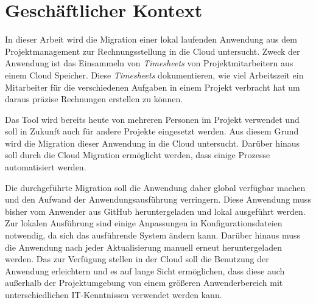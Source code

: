 \section{Geschäftlicher Kontext}

In dieser Arbeit wird die Migration einer lokal laufenden Anwendung aus dem Projektmanagement zur Rechnungsstellung in die Cloud untersucht. Zweck der Anwendung ist das Einsammeln von \textit{\glspl{Timesheet}} von Projektmitarbeitern aus einem Cloud Speicher. Diese \textit{\glspl{Timesheet}} dokumentieren, wie viel Arbeitszeit ein Mitarbeiter für die verschiedenen Aufgaben in einem Projekt verbracht hat um daraus präzise Rechnungen erstellen zu können.

Das Tool wird bereits heute von mehreren Personen im Projekt verwendet und soll in Zukunft auch für andere Projekte eingesetzt werden. Aus diesem Grund wird die Migration dieser Anwendung in die Cloud untersucht.
Darüber hinaus soll durch die Cloud Migration ermöglicht werden, dass einige Prozesse automatisiert werden.


Die durchgeführte Migration soll die Anwendung daher global verfügbar machen und den Aufwand der Anwendungsausführung verringern. Diese Anwendung muss bisher vom Anwender aus GitHub heruntergeladen und lokal ausgeführt werden. Zur lokalen Ausführung sind einige Anpassungen in Konfigurationsdateien notwendig, da sich das ausführende System ändern kann. Darüber hinaus muss die Anwendung nach jeder Aktualisierung manuell erneut heruntergeladen werden. Das zur Verfügung stellen in der Cloud soll die Benutzung der Anwendung erleichtern und es auf lange Sicht ermöglichen, dass diese auch außerhalb der Projektumgebung von einem größeren Anwenderbereich mit unterschiedlichen IT-Kenntnissen verwendet werden kann.